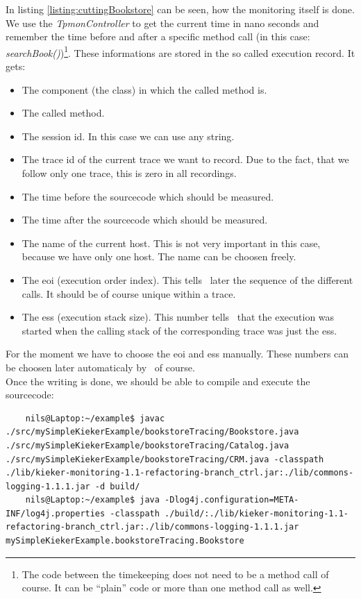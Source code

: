 \documentclass[a4paper, oneside, 11pt]{scrartcl}
\begin{document}
      In listing \ref{listing:cuttingBookstore} can be seen, how the monitoring itself is done. We use the \textit{TpmonController} to get the current time in nano seconds and remember the time before and after a specific method call (in this case: \textit{searchBook()})\footnote{The code between the timekeeping does not need to be a method call of course. It can be ``plain'' code or more than one method call as well.}. These informations are stored in the so called execution record. It gets:
      \begin{itemize}
	\item The component (the class) in which the called method is.
	\item The called method.
	\item The session id. In this case we can use any string.
	\item The trace id of the current trace we want to record. Due to the fact, that we follow only one trace, this is zero in all recordings.
	\item The time before the sourcecode which should be measured.
	\item The time after the sourcecode which should be measured.
	\item The name of the current host. This is not very important in this case, because we have only one host. The name can be choosen freely.
	\item The eoi (execution order index). This tells \Kieker\ later the sequence of the different calls. It should be of course unique within a trace.
	\item The ess (execution stack size). This number tells \Kieker\ that the execution was started when the calling stack of the corresponding trace was just the                
              ess.
      \end{itemize}
      For the moment we have to choose the eoi and ess manually. These numbers can be choosen later automaticaly by \Kieker\ of course.\\
      Once the writing is done, we should be able to compile and execute the sourcecode:
      \setBashListing
      \begin{lstlisting}
	nils@Laptop:~/example$ javac ./src/mySimpleKiekerExample/bookstoreTracing/Bookstore.java ./src/mySimpleKiekerExample/bookstoreTracing/Catalog.java ./src/mySimpleKiekerExample/bookstoreTracing/CRM.java -classpath ./lib/kieker-monitoring-1.1-refactoring-branch_ctrl.jar:./lib/commons-logging-1.1.1.jar -d build/
	nils@Laptop:~/example$ java -Dlog4j.configuration=META-INF/log4j.properties -classpath ./build/:./lib/kieker-monitoring-1.1-refactoring-branch_ctrl.jar:./lib/commons-logging-1.1.1.jar mySimpleKiekerExample.bookstoreTracing.Bookstore
      \end{lstlisting}
\end{document}
